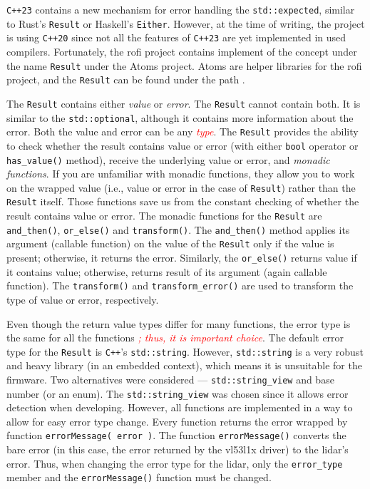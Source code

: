 \documentclass[
  digital,     %
  oneside,     %
  nosansbold,  %
  nocolorbold, %
  nolof,         %
  nolot,         %
]{fithesis4}
\newcommand{\TODO}[1]{\textcolor{red}{\textit{#1}}}
\begin{document}
{{{\verb|C++23| contains a new mechanism for error handling the \lstinline|std::expected|, similar to Rust's \lstinline|Result| or Haskell's \lstinline|Either|. However, at the time of writing, the project is using \verb|C++20| since not all the features of \verb|C++23| are yet implemented in used compilers. Fortunately, the \acrshort{rofi} project contains implement of the concept under the name \lstinline|Result| under the Atoms project. Atoms are helper libraries for the \acrshort{rofi} project, and the \lstinline|Result| can be found under the path .

The \lstinline|Result| contains either \emph{value} or \emph{error}. The \lstinline|Result| cannot contain both. It is similar to the \lstinline|std::optional|, although it contains more information about the error. Both the value and error can be any \TODO{type}. The \lstinline|Result| provides the ability to check whether the result contains value or error (with either \lstinline|bool| operator or \lstinline|has_value()| method), receive the underlying value or error, and \emph{monadic functions}. If you are unfamiliar with monadic functions, they allow you to work on the wrapped value (i.e., value or error in the case of \lstinline|Result|) rather than the \lstinline|Result| itself. Those functions save us from the constant checking of whether the result contains value or error. The monadic functions for the \lstinline|Result| are \lstinline|and_then()|, \lstinline|or_else()| and \lstinline|transform()|. The \lstinline|and_then()| method applies its argument (callable function) on the value of the \lstinline|Result| only if the value is present; otherwise, it returns the error. Similarly, the \lstinline|or_else()| returns value if it contains value; otherwise, returns result of its argument (again callable function). The \lstinline|transform()| and \lstinline|transform_error()| are used to transform the type of value or error, respectively.

Even though the return value types differ for many functions, the error type is the same for all the functions \TODO{; thus, it is important choice}. The default error type for the \lstinline|Result| is \verb|C++|'s \lstinline|std::string|. However, \lstinline|std::string| is a very robust and heavy library (in an embedded context), which means it is unsuitable for the firmware. Two alternatives were considered --- \lstinline|std::string_view| and base number (or an enum). The \lstinline|std::string_view| was chosen since it allows error detection when developing. However, all functions are implemented in a way to allow for easy error type change. Every function returns the error wrapped by function \lstinline|errorMessage( error )|. The function \lstinline|errorMessage()| converts the bare error (in this case, the error returned by the \gls{vl53l1x} driver) to the \acrshort{lidar}'s error. Thus, when changing the error type for the \acrshort{lidar}, only the \lstinline|error_type| member and the \lstinline|errorMessage()| function must be changed.

}}}
\end{document}
